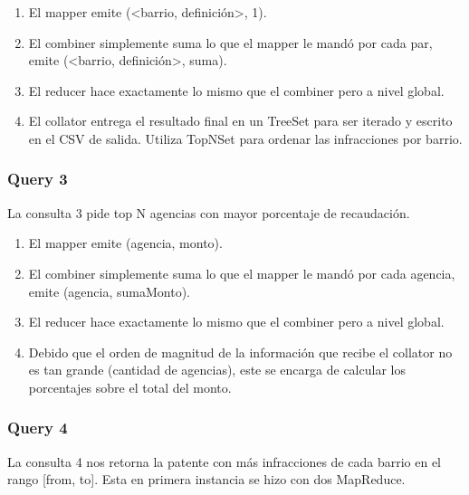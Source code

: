 \documentclass[a4paper,12pt]{article}
\begin{document}
	\begin{enumerate}
		\item El mapper emite (<barrio, definición>, 1).
		\item El combiner simplemente suma lo que el mapper le mandó por cada par, emite (<barrio, definición>, suma).
		\item El reducer hace exactamente lo mismo que el combiner pero a nivel global.
		\item El collator entrega el resultado final en un TreeSet para ser iterado y escrito en el CSV de salida. Utiliza TopNSet para ordenar las infracciones por barrio.
	\end{enumerate}

	\subsubsection{Query 3}
	
	La consulta 3 pide top N agencias con mayor porcentaje de recaudación.
	
	\begin{enumerate}
		\item El mapper emite (agencia, monto).
		\item El combiner simplemente suma lo que el mapper le mandó por cada agencia, emite (agencia, sumaMonto).
		\item El reducer hace exactamente lo mismo que el combiner pero a nivel global.
		\item Debido que el orden de magnitud de la información que recibe el collator no es tan grande (cantidad de agencias), este se encarga de calcular los porcentajes sobre el total del monto.
	\end{enumerate}

	\subsubsection{Query 4}
	
	La consulta 4 nos retorna la patente con más infracciones de cada barrio en el rango [from, to]. Esta en primera instancia se hizo con dos MapReduce.
	
\end{document}
